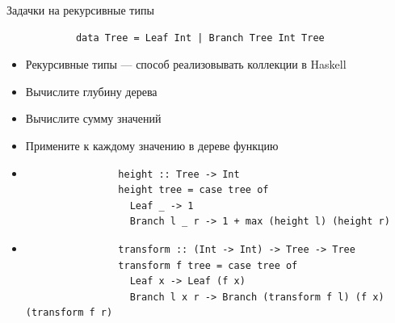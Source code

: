     \begin{frame}[fragile]{Задачки на рекурсивные типы}
        \begin{verbatim}
            data Tree = Leaf Int | Branch Tree Int Tree
        \end{verbatim}
        \begin{itemize}
            \item Рекурсивные типы --- способ реализовывать коллекции в Haskell
            \item[\todo] Вычислите глубину дерева
            \item[\todo] Вычислите сумму значений
            \item[\todo] Примените к каждому значению в дереве функцию
            \item[\answer] \pause
            \begin{verbatim}
                height :: Tree -> Int
                height tree = case tree of
                  Leaf _ -> 1
                  Branch l _ r -> 1 + max (height l) (height r)
            \end{verbatim}
            \item[\answer] \pause
            \begin{verbatim}
                transform :: (Int -> Int) -> Tree -> Tree
                transform f tree = case tree of
                  Leaf x -> Leaf (f x)
                  Branch l x r -> Branch (transform f l) (f x) (transform f r)
            \end{verbatim}
        \end{itemize}
    \end{frame}


